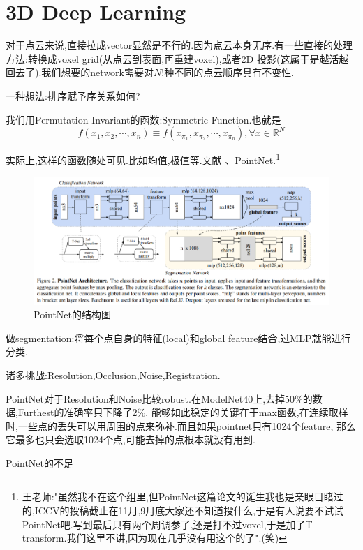 \section{3D Deep Learning}

对于点云来说,直接拉成vector显然是不行的.因为点云本身无序.有一些直接的处理方法:转换成voxel grid(从点云到表面,再重建voxel),或者2D 投影(这属于是越活越回去了).我们想要的network需要对$N!$种不同的点云顺序具有不变性.

一种想法:排序赋予序关系如何?

我们用Permutation Invariant的函数:Symmetric Function.也就是
\begin{equation}
    f(x_1, x_2, \cdots, x_n) \equiv f(x_{\pi_1}, x_{\pi_2}, \cdots, x_{\pi_n}), \forall x \in \mathbb R^N
\end{equation}

实际上,这样的函数随处可见.比如均值,极值等.文献\cite{PointNet} 、PointNet.\footnote{王老师:"虽然我不在这个组里,但PointNet这篇论文的诞生我也是亲眼目睹过的,ICCV的投稿截止在11月,9月底大家还不知道投什么,于是有人说要不试试PointNet吧.写到最后只有两个周调参了,还是打不过voxel,于是加了T-transform.我们这里不讲,因为现在几乎没有用这个的了".(笑)}
\begin{figure}[htbp]
    \centering
    \includegraphics[scale=0.6]{figures/PointNet.png}
    \caption{PointNet的结构图}
    \label{}
\end{figure}

做segmentation:将每个点自身的特征(local)和global feature结合,过MLP就能进行分类.

诸多挑战:Resolution,Occlusion,Noise,Registration.

PointNet对于Resolution和Noise比较robust.在ModelNet40上,去掉50\%的数据,Furthest的准确率只下降了2\%.
能够如此稳定的关键在于max函数,在连续取样时,一些点的丢失可以用周围的点来弥补.而且如果pointnet只有1024个feature,
那么它最多也只会选取1024个点,可能去掉的点根本就没有用到.

PointNet的不足

